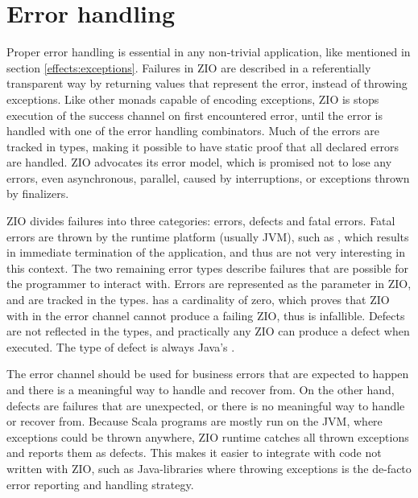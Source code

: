 


\section{Error handling} \label{zio:error-handling}
Proper error handling is essential in any non-trivial application, like mentioned in section \ref{effects:exceptions}. Failures in ZIO are described in a referentially transparent way by returning values that represent the error, instead of throwing exceptions. Like other monads capable of encoding exceptions, ZIO is stops execution of the success channel on first encountered error, until the error is handled with one of the error handling combinators. Much of the errors are tracked in types, making it possible to have static proof that all declared errors are handled. ZIO advocates its error model, which is promised not to lose any errors, even asynchronous, parallel, caused by interruptions, or exceptions thrown by finalizers.

ZIO divides failures into three categories: errors, defects and fatal errors. Fatal errors are thrown by the runtime platform (usually JVM), such as , which results in immediate termination of the application, and thus are not very interesting in this context. The two remaining error types describe failures that are possible for the programmer to interact with. Errors are represented as the  parameter in ZIO, and are tracked in the types.
 has a cardinality of zero, which proves that ZIO with  in the error channel cannot produce a failing ZIO, thus is infallible. Defects are not reflected in the types, and practically any ZIO can produce a defect when executed. The type of defect is always Java's .

The error channel should be used for business errors that are expected to happen and there is a meaningful way to handle and recover from. On the other hand, defects are failures that are unexpected, or there is no meaningful way to handle or recover from. Because Scala programs are mostly run on the JVM, where exceptions could be thrown anywhere, ZIO runtime catches all thrown exceptions and reports them as defects. This makes it easier to integrate with code not written with ZIO, such as Java-libraries where throwing exceptions is the de-facto error reporting and handling strategy.

